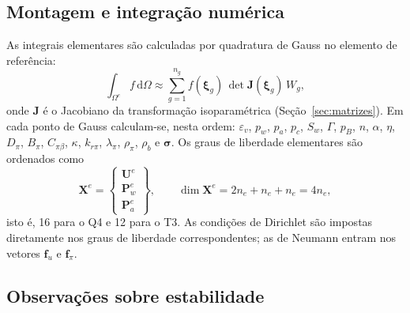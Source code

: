 \documentclass[11pt,a4paper]{article}
\numberwithin{equation}{section}
\newcommand{\dd}{\mathrm{d}}
\begin{document}
\subsection{Montagem e integração numérica}

As integrais elementares são calculadas por quadratura de Gauss no elemento
de referência:
\begin{equation}
\int_{\Omega^e}f\,\dd\Omega\approx\sum_{g=1}^{n_g}f(\boldsymbol\xi_g)\,\det\mathbf J(\boldsymbol\xi_g)\,W_g ,
\end{equation}
onde $\mathbf J$ é o Jacobiano da transformação isoparamétrica
(Seção~\ref{sec:matrizes}). Em cada ponto de Gauss calculam-se, nesta ordem:
$\varepsilon_v$, $p_w$, $p_a$, $p_c$, $S_w$, $\Gamma$, $p_B$, $n$, $\alpha$,
$\eta$, $D_\pi$, $B_\pi$, $C_{\pi\beta}$, $\kappa$, $k_{r\pi}$, $\lambda_\pi$,
$\rho_\pi$, $\rho_b$ e $\boldsymbol\sigma$. Os graus de liberdade elementares
são ordenados como
\begin{equation}
\mathbf X^e=\begin{Bmatrix}\mathbf U^e\\ \mathbf P_w^e\\ \mathbf P_a^e\end{Bmatrix},
\qquad
\dim\mathbf X^e=2n_e+n_e+n_e=4n_e,
\end{equation}
isto é, 16 para o Q4 e 12 para o T3. As condições de Dirichlet são impostas
diretamente nos graus de liberdade correspondentes; as de Neumann entram
nos vetores $\mathbf f_u$ e $\mathbf f_\pi$.

\subsection{Observações sobre estabilidade}
\end{document}

